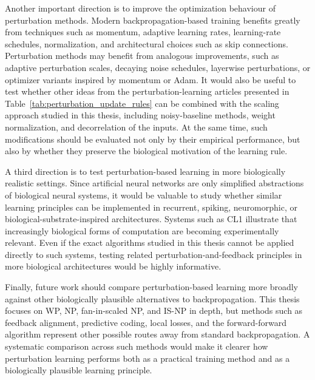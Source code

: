 Another important direction is to improve the optimization behaviour of perturbation methods. Modern backpropagation-based training benefits greatly from techniques such as momentum, adaptive learning rates, learning-rate schedules, normalization, and architectural choices such as skip connections. Perturbation methods may benefit from analogous improvements, such as adaptive perturbation scales, decaying noise schedules, layerwise perturbations, or optimizer variants inspired by momentum or Adam. It would also be useful to test whether other ideas from the perturbation-learning articles presented in Table~\ref{tab:perturbation_update_rules} can be combined with the scaling approach studied in this thesis, including noisy-baseline methods, weight normalization, and decorrelation of the inputs. At the same time, such modifications should be evaluated not only by their empirical performance, but also by whether they preserve the biological motivation of the learning rule.

A third direction is to test perturbation-based learning in more biologically realistic settings. Since artificial neural networks are only simplified abstractions of biological neural systems, it would be valuable to study whether similar learning principles can be implemented in recurrent, spiking, neuromorphic, or biological-substrate-inspired architectures. Systems such as CL1 illustrate that increasingly biological forms of computation are becoming experimentally relevant. Even if the exact algorithms studied in this thesis cannot be applied directly to such systems, testing related perturbation-and-feedback principles in more biological architectures would be highly informative.

Finally, future work should compare perturbation-based learning more broadly against other biologically plausible alternatives to backpropagation. This thesis focuses on WP, NP, fan-in-scaled NP, and IS-NP in depth, but methods such as feedback alignment, predictive coding, local losses, and the forward-forward algorithm represent other possible routes away from standard backpropagation. A systematic comparison across such methods would make it clearer how perturbation learning performs both as a practical training method and as a biologically plausible learning principle.

